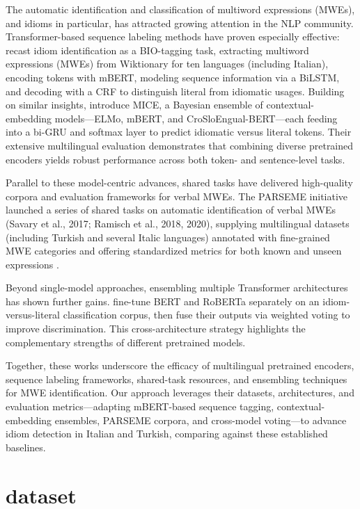 \documentclass[11pt]{article}
\begin{document}
The automatic identification and classification of multiword expressions (MWEs), and idioms in particular, has attracted growing attention in the NLP community. Transformer-based sequence labeling methods have proven especially effective: \citet{ID10M:2022} recast idiom identification as a BIO-tagging task, extracting multiword expressions (MWEs) from Wiktionary for ten languages (including Italian), encoding tokens with mBERT, modeling sequence information via a BiLSTM, and decoding with a CRF to distinguish literal from idiomatic usages. Building on similar insights, \citet{Skvorc2022MICE} introduce MICE, a Bayesian ensemble of contextual-embedding models—ELMo, mBERT, and CroSloEngual-BERT—each feeding into a bi-GRU and softmax layer to predict idiomatic versus literal tokens. Their extensive multilingual evaluation demonstrates that combining diverse pretrained encoders yields robust performance across both token- and sentence-level tasks.

Parallel to these model-centric advances, shared tasks have delivered high-quality corpora and evaluation frameworks for verbal MWEs. The PARSEME initiative launched a series of shared tasks on automatic identification of verbal MWEs (Savary et al., 2017; Ramisch et al., 2018, 2020), supplying multilingual datasets (including Turkish and several Italic languages) annotated with fine-grained MWE categories and offering standardized metrics for both known and unseen expressions \citep{savary-etal-2017-parseme}. 

Beyond single-model approaches, ensembling multiple Transformer architectures has shown further gains. \citet{ensembleBERTRoBERTa:2022} fine-tune BERT and RoBERTa separately on an idiom-versus-literal classification corpus, then fuse their outputs via weighted voting to improve discrimination. This cross-architecture strategy highlights the complementary strengths of different pretrained models.

Together, these works underscore the efficacy of multilingual pretrained encoders, sequence labeling frameworks, shared-task resources, and ensembling techniques for MWE identification. Our approach leverages their datasets, architectures, and evaluation metrics—adapting mBERT-based sequence tagging, contextual-embedding ensembles, PARSEME corpora, and cross-model voting—to advance idiom detection in Italian and Turkish, comparing against these established baselines.

\section{dataset}
\end{document}
